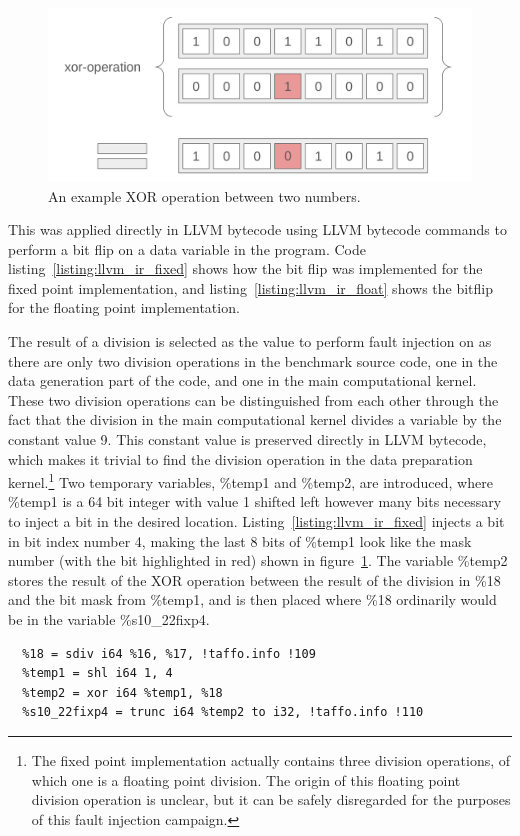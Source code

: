 \begin{figure}[h!]
    \centering
    \includegraphics[width=0.5\linewidth]{Images/xor_operation.png}
    \caption{An example XOR operation between two numbers.}
    \label{fig:xor_operation}
\end{figure}

This was applied directly in LLVM bytecode using LLVM bytecode commands to perform a bit flip on a data variable in the program. Code listing~\ref{listing:llvm_ir_fixed} shows how the bit flip was implemented for the fixed point implementation, and listing~\ref{listing:llvm_ir_float} shows the bitflip for the floating point implementation.



The result of a division is selected as the value to perform fault injection on as there are only two division operations in the benchmark source code, one in the data generation part of the code, and one in the main computational kernel. These two division operations can be distinguished from each other through the fact that the division in the main computational kernel divides a variable by the constant value 9. This constant value is preserved directly in LLVM bytecode, which makes it trivial to find the division operation in the data preparation kernel.\footnote{The fixed point implementation actually contains three division operations, of which one is a floating point division. The origin of this floating point division operation is unclear, but it can be safely disregarded for the purposes of this fault injection campaign.}
Two temporary variables, \%temp1 and \%temp2, are introduced, where \%temp1 is a 64 bit integer with value 1 shifted left however many bits necessary to inject a bit in the desired location. Listing~\ref{listing:llvm_ir_fixed} injects a bit in bit index number 4, making the last 8 bits of \%temp1 look like the mask number (with the bit highlighted in red) shown in figure~\ref{fig:xor_operation}.
The variable \%temp2 stores the result of the XOR operation between the result of the division in \%18 and the bit mask from \%temp1, and is then placed where \%18 ordinarily would be in the variable \%s10\_22fixp4.

\begin{lstlisting}[caption=fixed point bit flip in LLVM bytecode, label=listing:llvm_ir_fixed]
  %17 = sext i32 %0 to i64, !taffo.info !45
  %18 = sdiv i64 %16, %17, !taffo.info !109
  %temp1 = shl i64 1, 4
  %temp2 = xor i64 %temp1, %18
  %s10_22fixp4 = trunc i64 %temp2 to i32, !taffo.info !110
\end{lstlisting} 

